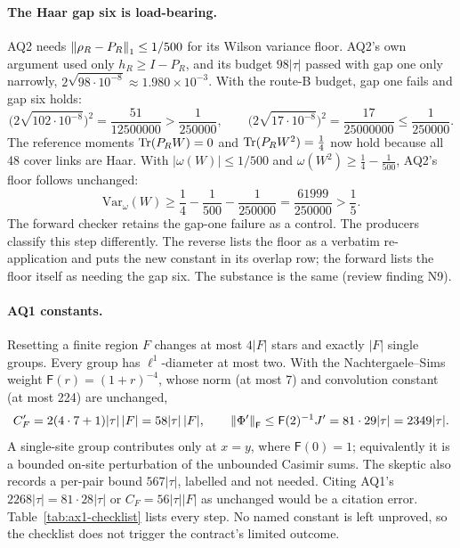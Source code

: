 \paragraph{The Haar gap six is load-bearing.}
AQ2 needs $\left\lVert\rho_R-P_R\right\rVert_1\le1/500$ for its Wilson variance floor. AQ2's
own argument used only $h_R\ge I-P_R$, and its budget $98|\tau|$ passed with
gap one only narrowly, $2\sqrt{98\cdot10^{-8}}\approx1.980\times10^{-3}$. With
the route-B budget, gap one fails and gap six holds:
\begin{equation}
 \bigl(2\sqrt{102\cdot10^{-8}}\bigr)^2=\frac{51}{12500000}>\frac1{250000},\qquad
 \bigl(2\sqrt{17\cdot10^{-8}}\bigr)^2=\frac{17}{25000000}\le\frac1{250000}.
 \label{eq:ax1-gapsix}
\end{equation}
The reference moments $\operatorname{Tr}(P_RW)=0$ and $\operatorname{Tr}(P_RW^2)=\tfrac14$ now hold
because all 48 cover links are Haar. With $|\omega(W)|\le1/500$ and
$\omega(W^2)\ge\tfrac14-\tfrac1{500}$, AQ2's floor follows unchanged:
\begin{equation}
 \mathrm{Var}_\omega(W)\ge\frac14-\frac1{500}-\frac1{250000}
 =\frac{61999}{250000}>\frac15 .
 \label{eq:ax1-floor}
\end{equation}
The forward checker retains the gap-one failure as a control. The producers
classify this step differently. The reverse lists the floor as a verbatim
re-application and puts the new constant in its overlap row; the forward
lists the floor itself as needing the gap six. The substance is the same
(review finding N9).

\paragraph{AQ1 constants.}
Resetting a finite region $F$ changes at most $4|F|$ stars and exactly $|F|$
single groups. Every group has $\ell^1$-diameter at most two. With the
Nachtergaele--Sims weight $\mathsf F(r)=(1+r)^{-4}$, whose norm (at most 7)
and convolution constant (at most 224) are unchanged,
\begin{equation}
 C_F'=2(4\cdot7+1)|\tau|\,|F|=58|\tau|\,|F|,\qquad
 \left\lVert\Phi'\right\rVert_{\mathsf F}\le\mathsf F(2)^{-1}J'=81\cdot29|\tau|=2349|\tau| .
 \label{eq:ax1-aq1}
\end{equation}
A single-site group contributes only at $x=y$, where $\mathsf F(0)=1$;
equivalently it is a bounded on-site perturbation of the unbounded Casimir
sums. The skeptic also records a per-pair bound $567|\tau|$, labelled and not
needed. Citing AQ1's $2268|\tau|=81\cdot28|\tau|$ or $C_F=56|\tau||F|$ as
unchanged would be a citation error. Table~\ref{tab:ax1-checklist} lists every
step. No named constant is left unproved, so the checklist does not trigger
the contract's limited outcome.

